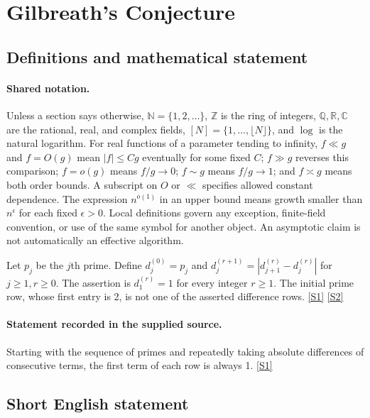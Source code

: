 \documentclass[11pt,a4paper]{article}
\newcommand{\N}{\mathbb{N}}
\newcommand{\Z}{\mathbb{Z}}
\newcommand{\Q}{\mathbb{Q}}
\newcommand{\R}{\mathbb{R}}
\newcommand{\C}{\mathbb{C}}
\newcommand{\sref}[2]{\hyperlink{source:#1:#2}{[S#2]}}
\begin{document}
\section{Gilbreath's Conjecture}\label{statement}


\subsection{Definitions and mathematical statement}

\paragraph{Shared notation.}Unless a section says otherwise, $\N=\{1,2,\ldots\}$,
$\Z$ is the ring of integers, $\Q,\R,\C$ are the rational, real, and complex
fields, $[N]=\{1,\ldots,\lfloor N\rfloor\}$, and $\log$ is the natural
logarithm. For real functions of a parameter tending to infinity,
$f\ll g$ and $f=O(g)$ mean $|f|\leq Cg$ eventually for some fixed $C$;
$f\gg g$ reverses this comparison; $f=o(g)$ means $f/g\to0$;
$f\sim g$ means $f/g\to1$; and $f\asymp g$ means both order bounds.
A subscript on $O$ or $\ll$ specifies allowed constant dependence.
The expression $n^{o(1)}$ in an upper bound means growth smaller than
$n^\epsilon$ for each fixed $\epsilon>0$. Local definitions govern any
exception, finite-field convention, or use of the same symbol for another
object. An asymptotic claim is not automatically an effective algorithm.



Let $p_j$ be the $j$th prime. Define $d_j^{(0)}=p_j$ and $d_j^{(r+1)}=|d_{j+1}^{(r)}-d_j^{(r)}|$ for $j\geq1,r\geq0$. The assertion is $d_1^{(r)}=1$ for every integer $r\geq1$. The initial prime row, whose first entry is 2, is not one of the asserted difference rows. \sref{statement}{1} \sref{statement}{2}

\paragraph{Statement recorded in the supplied source.}
Starting with the sequence of primes and repeatedly taking absolute differences of consecutive terms, the first term of each row is always 1. \sref{statement}{1}

\subsection{Short English statement}
\end{document}

